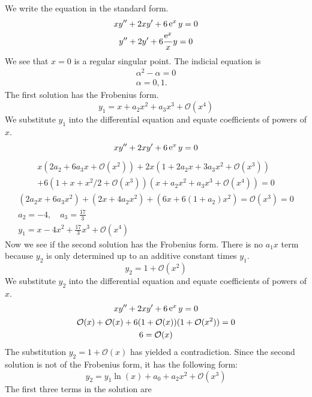 {\begin{Solution}
  \label{solution xy+2xy+6exy=0}
  We write the equation in the standard form.
  \begin{gather*}
    x y'' + 2 x y' + 6 \mathop{\mathrm{e}}\nolimits^x y = 0
    \\
    y'' + 2 y' + 6 \frac{\mathop{\mathrm{e}}\nolimits^x}{x} y = 0
  \end{gather*}
  We see that $x = 0$ is a regular singular point.
  The indicial equation is 
  \begin{gather*}
    \alpha^2 - \alpha = 0
    \\
    \alpha = 0,1.
  \end{gather*}
  The first solution has the Frobenius form.
  \[
  y_1 = x + a_2 x^2 + a_3 x^3 + \mathcal{O}(x^4)
  \]
  We substitute $y_1$ into the differential equation and equate coefficients
  of powers of $x$.
  \[
  x y'' + 2 x y' + 6 \mathop{\mathrm{e}}\nolimits^x y = 0
  \]
  \begin{multline*}
    x ( 2 a_2 + 6 a_3 x + \mathcal{O}(x^2) )
    + 2 x ( 1 + 2 a_2 x + 3 a_3 x^2 + \mathcal{O}(x^3) )
    \\
    + 6 ( 1 + x + x^2/2 + \mathcal{O}(x^3) )( x + a_2 x^2 + a_3 x^3 + \mathcal{O}(x^4) )
    = 0
  \end{multline*}
  \begin{gather*}
    ( 2 a_2 x + 6 a_3 x^2 )
    + ( 2 x + 4 a_2 x^2 )
    + ( 6 x + 6(1 + a_2) x^2 ) = \mathcal{O}(x^3)
    = 0
    \\
    a_2 = -4, \quad a_3 = \frac{17}{3}
    \\
    \boxed{
      y_1 = x -4 x^2 + \frac{17}{3} x^3 + \mathcal{O}(x^4)
      }
  \end{gather*}
  Now we see if the second solution has the Frobenius form.
  There is no $a_1 x$ term because $y_2$ is only determined up to an additive 
  constant times $y_1$.  
  \[
  y_2 = 1 + \mathcal{O}(x^2)
  \]
  We substitute $y_2$ into the differential equation and equate coefficients
  of powers of $x$.
  \begin{gather*}
    x y'' + 2 x y' + 6 \mathop{\mathrm{e}}\nolimits^x y = 0
    \\
    \mathcal{O}(x) + \mathcal{O}(x) 
    + 6 ( 1 + \mathcal{O}(x) )( 1 + \mathcal{O}(x^2) ) = 0
    \\
    6 = \mathcal{O}(x)
  \end{gather*}
  The substitution $y_2 = 1 + \mathcal{O}(x)$ has yielded a contradiction.
  Since the second solution is not of the Frobenius form, it has the 
  following form:
  \[
  y_2 = y_1 \ln(x) + a_0 + a_2 x^2 + \mathcal{O}(x^3)
  \]
  The first three terms in the solution are

\end{Solution}}
